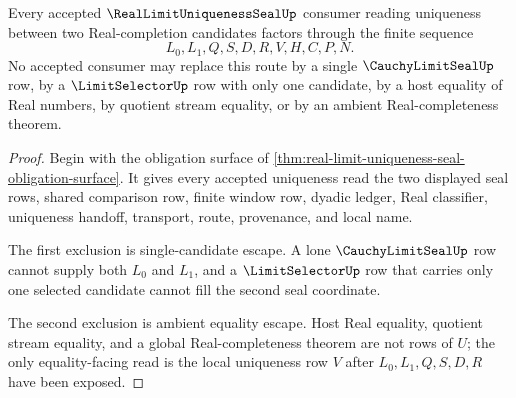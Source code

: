 \begin{theorem}
\label{thm:real-limit-uniqueness-seal-nonescape}
Every accepted $\RealLimitUniquenessSealUp$ consumer reading uniqueness between two Real-completion candidates factors through the finite sequence
$$
L_0,L_1,Q,S,D,R,V,H,C,P,N.
$$
No accepted consumer may replace this route by a single $\CauchyLimitSealUp$ row, by a $\LimitSelectorUp$ row with only one candidate, by a host equality of Real numbers, by quotient stream equality, or by an ambient Real-completeness theorem.
\end{theorem}
\begin{proof}
Begin with the obligation surface of \autoref{thm:real-limit-uniqueness-seal-obligation-surface}. It gives every accepted uniqueness read the two displayed seal rows, shared comparison row, finite window row, dyadic ledger, Real classifier, uniqueness handoff, transport, route, provenance, and local name.

The first exclusion is single-candidate escape. A lone $\CauchyLimitSealUp$ row cannot supply both $L_0$ and $L_1$, and a $\LimitSelectorUp$ row that carries only one selected candidate cannot fill the second seal coordinate.

The second exclusion is ambient equality escape. Host Real equality, quotient stream equality, and a global Real-completeness theorem are not rows of $U$; the only equality-facing read is the local uniqueness row $V$ after $L_0,L_1,Q,S,D,R$ have been exposed.
\end{proof}

